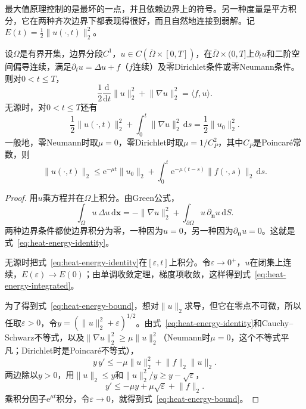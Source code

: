 最大值原理控制的是最坏的一点，并且依赖边界上的符号。另一种度量是平方积分，它在两种齐次边界下都表现得很好，而且自然地连接到弱解。记$E(t)=\tfrac12\lVert u(\cdot,t)\rVert_2^2$。

\begin{theorem}[能量估计]
\label{thm:heat-energy}
设$\Omega$是有界开集，边界分段$C^1$，$u\in C(\overline\Omega\times[0,T])$，在$\overline\Omega\times(0,T]$上$\partial_tu$和二阶空间偏导连续，满足$\partial_tu=\Delta u+f$（$f$连续）及零Dirichlet条件或零Neumann条件。则对$0<t\leq T$，
\begin{equation}
 \frac12\frac{\mathrm{d}}{\mathrm{d}t}\lVert u\rVert_2^2+\lVert\nabla u\rVert_2^2=\langle f,u\rangle .
 \label{eq:heat-energy-identity}
\end{equation}
无源时，对$0<t\leq T$还有
\begin{equation}
 \frac12\lVert u(\cdot,t)\rVert_2^2+\int_0^t\lVert\nabla u\rVert_2^2\,\mathrm{d}s=\frac12\lVert u_0\rVert_2^2 .
 \label{eq:heat-energy-integrated}
\end{equation}
一般地，零Neumann时取$\mu=0$，零Dirichlet时取$\mu=1/C_P^2$，其中$C_P$是Poincaré常数，则
\begin{equation}
 \lVert u(\cdot,t)\rVert_2\leq\mathrm{e}^{-\mu t}\lVert u_0\rVert_2+\int_0^t\mathrm{e}^{-\mu(t-s)}\lVert f(\cdot,s)\rVert_2\,\mathrm{d}s .
 \label{eq:heat-energy-bound}
\end{equation}
\end{theorem}

\begin{proof}
用$u$乘方程并在$\Omega$上积分。由Green公式，
\[
 \int_\Omega u\,\Delta u\,\mathrm{d}\bm{x}=-\lVert\nabla u\rVert_2^2+\int_{\partial\Omega}u\,\partial_{\bm{n}}u\,\mathrm{d}S .
\]
两种边界条件都使边界积分为零，一种因为$u=0$，另一种因为$\partial_{\bm{n}}u=0$。这就是式~\eqref{eq:heat-energy-identity}。

无源时把式~\eqref{eq:heat-energy-identity}在$[\varepsilon,t]$上积分。令$\varepsilon\to0^+$，$u$在闭集上连续，$E(\varepsilon)\to E(0)$；由单调收敛定理，梯度项收敛，这样得到式~\eqref{eq:heat-energy-integrated}。

为了得到式~\eqref{eq:heat-energy-bound}，想对$\lVert u\rVert_2$求导，但它在零点不可微，所以任取$\varepsilon>0$，令$y=(\lVert u\rVert_2^2+\varepsilon)^{1/2}$。由式~\eqref{eq:heat-energy-identity}和Cauchy--Schwarz不等式，以及$\lVert\nabla u\rVert_2^2\geq\mu\lVert u\rVert_2^2$（Neumann时$\mu=0$，这个不等式平凡；Dirichlet时是Poincaré不等式），
\[
 y\,y'\leq-\mu\lVert u\rVert_2^2+\lVert f\rVert_2\lVert u\rVert_2 .
\]
两边除以$y>0$，用$\lVert u\rVert_2\leq y$和$\lVert u\rVert_2^2/y\geq y-\sqrt\varepsilon$，
\[
 y'\leq-\mu y+\mu\sqrt\varepsilon+\lVert f\rVert_2 .
\]
乘积分因子$\mathrm{e}^{\mu t}$积分，令$\varepsilon\to0$，就得到式~\eqref{eq:heat-energy-bound}。
\end{proof}

